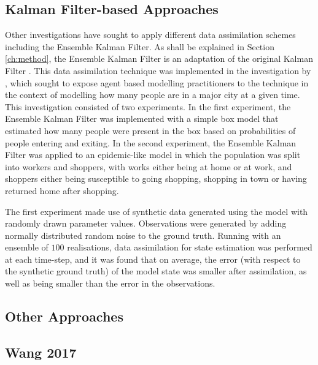 \subsection{Kalman Filter-based Approaches}\label{sub:lit_rev:da_abm:kf}

Other investigations have sought to apply different data assimilation schemes
including the Ensemble Kalman Filter.
As shall be explained in Section \ref{ch:method}, the Ensemble Kalman Filter is an
adaptation of the original Kalman Filter \citep{evensen2003ensemble}.
This data assimilation technique was implemented in the investigation by
\citet{ward2016dynamic}, which sought to expose agent based modelling
practitioners to the technique in the context of modelling how many people are
in a major city at a given time.
This investigation consisted of two experiments.
In the first experiment, the Ensemble Kalman Filter was implemented with a
simple box model that estimated how many people were present in the box based on
probabilities of people entering and exiting.
In the second experiment, the Ensemble Kalman Filter was applied to an
epidemic-like model in which the population was split into workers and shoppers,
with works either being at home or at work, and shoppers either being
susceptible to going shopping, shopping in town or having returned home after
shopping.

The first experiment made use of synthetic data generated using the model with
randomly drawn parameter values.
Observations were generated by adding normally distributed random noise to the
ground truth.
Running with an ensemble of $100$ realisations, data assimilation for state
estimation was performed at each time-step, and it was found that on average,
the error (with respect to the synthetic ground truth) of the model state was
smaller after assimilation, as well as being smaller than the error in the
observations.


\subsection{Other Approaches}\label{sub:lit_rev:da_abm:other}

\subsection{Wang 2017}


